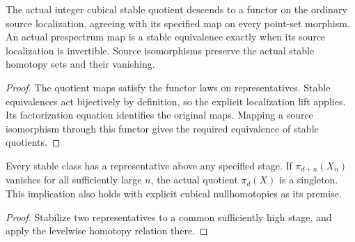 \begin{proposition}
  \label{prop:actual-source-homotopy-functor}
  \leanok
  The actual integer cubical stable quotient descends to a functor
  on the ordinary source localization, agreeing with its specified map
  on every point-set morphism. An actual prespectrum map is a stable
  equivalence exactly when its source localization is invertible.
  Source isomorphisms preserve the actual stable homotopy sets and their
  vanishing.
\end{proposition}
\begin{proof}
  The quotient maps satisfy the functor laws on representatives.
  Stable equivalences act bijectively by definition, so the explicit
  localization lift applies. Its factorization equation identifies the
  original maps. Mapping a source isomorphism through this functor gives
  the required equivalence of stable quotients.
  \leanok
\end{proof}

\begin{proposition}
  \label{prop:prespectrum-cofinal-vanishing}
  \leanok
  Every stable class has a representative above any specified stage.
  If $\pi_{d+n}(X_n)$ vanishes for all sufficiently large $n$, the actual
  quotient $\pi_d(X)$ is a singleton. This implication also holds with
  explicit cubical nullhomotopies as its premise.
\end{proposition}
\begin{proof}
  Stabilize two representatives to a common sufficiently high stage,
  and apply the levelwise homotopy relation there.
  \leanok
\end{proof}

